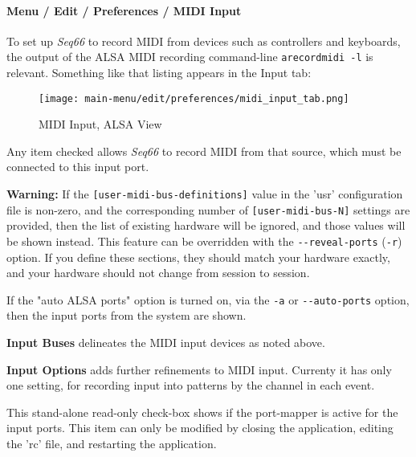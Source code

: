 \paragraph{Menu / Edit / Preferences / MIDI Input}
\label{paragraph:menu_edit_preferences_midi_input}

   To set up \textsl{Seq66} to record MIDI from devices such as
   controllers and keyboards, the output of the ALSA MIDI recording
   command-line \texttt{arecordmidi -l} is relevant.
   Something like that listing appears in the Input tab:

\begin{figure}[H]
   \centering 
   \texttt{[image: main-menu/edit/preferences/midi\_input\_tab.png]}
   \caption{MIDI Input, ALSA View}
   \label{fig:midi_input_tab}
\end{figure}

   Any item checked allows \textsl{Seq66} to record MIDI from that source,
   which must be connected to this input port.

   \textbf{Warning:}
   If the 
   \texttt{[user-midi-bus-definitions]} value in the 'usr' configuration file
   is non-zero, and the
   corresponding number of
   \texttt{[user-midi-bus-N]} settings are provided, then
   the list of existing hardware will be ignored, and those values will be
   shown instead.
   This feature can be overridden with the
   \texttt{-{}-reveal-ports} (\texttt{-r}) option.
   If you define these sections, they should match your
   hardware exactly, and your hardware should not change from session to
   session.

   If the "auto ALSA ports" option is turned on, via the \texttt{-a} or
   \texttt{-{}-auto-ports} option, then
   the input ports from the system are shown.

   \setcounter{ItemCounter}{0}      %

   \textbf{Input Buses} delineates the MIDI input devices as noted above.

   \textbf{Input Options} adds further refinements to MIDI input.
   Currenty it has only one setting, for recording input into patterns by the
   channel in each event.

   This stand-alone
   read-only check-box shows if the port-mapper is active for the input
   ports.  This item can only be modified by closing the application, editing
   the 'rc' file, and restarting the application.


